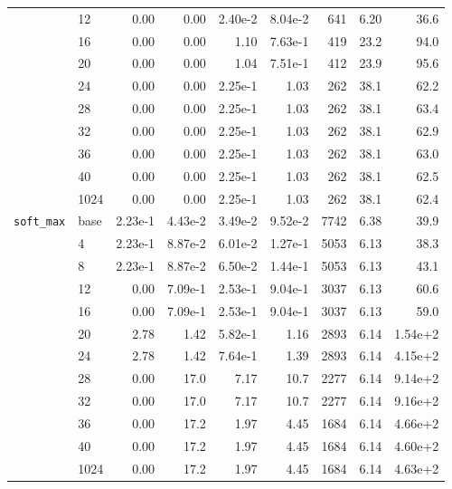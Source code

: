 \begin{longtable}{llrrrrrrr}
\cmidrule{2-9}
         & 12   &   0.00 & 0.00 & 2.40e-2 & 8.04e-2 &     641 &     6.20 & 36.6 \\
\cmidrule{2-9}
         & 16   &   0.00 & 0.00 & 1.10 & 7.63e-1 &     419 &     23.2 & 94.0 \\
\cmidrule{2-9}
         & 20   &   0.00 & 0.00 & 1.04 & 7.51e-1 &     412 &     23.9 & 95.6 \\
\cmidrule{2-9}
         & 24   &   0.00 & 0.00 & 2.25e-1 & 1.03 &     262 &     38.1 & 62.2 \\
\cmidrule{2-9}
         & 28   &   0.00 & 0.00 & 2.25e-1 & 1.03 &     262 &     38.1 & 63.4 \\
\cmidrule{2-9}
         & 32   &   0.00 & 0.00 & 2.25e-1 & 1.03 &     262 &     38.1 & 62.9 \\
\cmidrule{2-9}
         & 36   &   0.00 & 0.00 & 2.25e-1 & 1.03 &     262 &     38.1 & 63.0 \\
\cmidrule{2-9}
         & 40   &   0.00 & 0.00 & 2.25e-1 & 1.03 &     262 &     38.1 & 62.5 \\
\cmidrule{2-9}
         & 1024 &   0.00 & 0.00 & 2.25e-1 & 1.03 &     262 &     38.1 & 62.4 \\
\midrule
\texttt{soft\_max} & base &   2.23e-1 & 4.43e-2 & 3.49e-2 & 9.52e-2 &    7742 &     6.38 & 39.9 \\
\cmidrule{2-9}
         & 4    &   2.23e-1 & 8.87e-2 & 6.01e-2 & 1.27e-1 &    5053 &     6.13 & 38.3 \\
\cmidrule{2-9}
         & 8    &   2.23e-1 & 8.87e-2 & 6.50e-2 & 1.44e-1 &    5053 &     6.13 & 43.1 \\
\cmidrule{2-9}
         & 12   &   0.00 & 7.09e-1 & 2.53e-1 & 9.04e-1 &    3037 &     6.13 & 60.6 \\
\cmidrule{2-9}
         & 16   &   0.00 & 7.09e-1 & 2.53e-1 & 9.04e-1 &    3037 &     6.13 & 59.0 \\
\cmidrule{2-9}
         & 20   &   2.78 & 1.42 & 5.82e-1 & 1.16 &    2893 &     6.14 & 1.54e+2 \\
\cmidrule{2-9}
         & 24   &   2.78 & 1.42 & 7.64e-1 & 1.39 &    2893 &     6.14 & 4.15e+2 \\
\cmidrule{2-9}
         & 28   &   0.00 & 17.0 & 7.17 & 10.7 &    2277 &     6.14 & 9.14e+2 \\
\cmidrule{2-9}
         & 32   &   0.00 & 17.0 & 7.17 & 10.7 &    2277 &     6.14 & 9.16e+2 \\
\cmidrule{2-9}
         & 36   &   0.00 & 17.2 & 1.97 & 4.45 &    1684 &     6.14 & 4.66e+2 \\
\cmidrule{2-9}
         & 40   &   0.00 & 17.2 & 1.97 & 4.45 &    1684 &     6.14 & 4.60e+2 \\
\cmidrule{2-9}
         & 1024 &   0.00 & 17.2 & 1.97 & 4.45 &    1684 &     6.14 & 4.63e+2 \\
\end{longtable}

